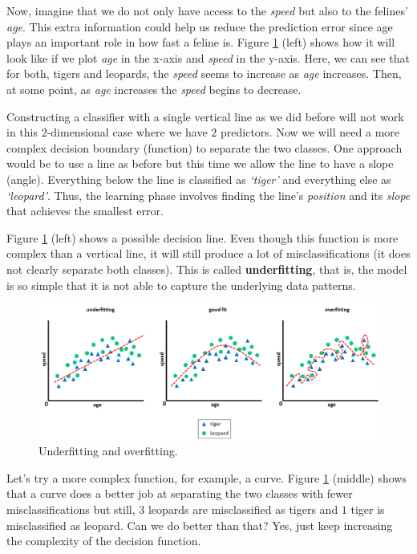 \documentclass[
  11pt,
]{krantz}
\begin{document}
Now, imagine that we do not only have access to the \emph{speed} but also to the felines' \emph{age}. This extra information could help us reduce the prediction error since age plays an important role in how fast a feline is. Figure \ref{fig:underOverFitting} (left) shows how it will look like if we plot \emph{age} in the x-axis and \emph{speed} in the y-axis. Here, we can see that for both, tigers and leopards, the \emph{speed} seems to increase as \emph{age} increases. Then, at some point, as \emph{age} increases the \emph{speed} begins to decrease.

Constructing a classifier with a single vertical line as we did before will not work in this \(2\)-dimensional case where we have \(2\) predictors. Now we will need a more complex decision boundary (function) to separate the two classes. One approach would be to use a line as before but this time we allow the line to have a slope (angle). Everything below the line is classified as \emph{`tiger'} and everything else as \emph{`leopard'}. Thus, the learning phase involves finding the line's \emph{position} and its \emph{slope} that achieves the smallest error.

Figure \ref{fig:underOverFitting} (left) shows a possible decision line. Even though this function is more complex than a vertical line, it will still produce a lot of misclassifications (it does not clearly separate both classes). This is called \textbf{underfitting}, that is, the model is so simple that it is not able to capture the underlying data patterns.

\begin{figure}

{\centering \includegraphics[width=1\linewidth]{images/under_over_fit} 

}

\caption{Underfitting and overfitting.}\label{fig:underOverFitting}
\end{figure}

Let's try a more complex function, for example, a curve. Figure \ref{fig:underOverFitting} (middle) shows that a curve does a better job at separating the two classes with fewer misclassifications but still, \(3\) leopards are misclassified as tigers and \(1\) tiger is misclassified as leopard. Can we do better than that? Yes, just keep increasing the complexity of the decision function.
\end{document}

